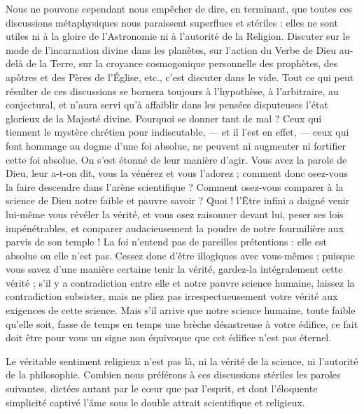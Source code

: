 \documentclass[a4paper, 11pt, oneside, landscape]{article}
\begin{document}
Nous ne pouvons cependant nous empêcher de dire, en terminant, que toutes ces discussions métaphysiques nous paraissent superflues et stériles : elles ne sont utiles ni à la gloire de l'Astronomie ni à l'autorité de la Religion. Discuter sur le mode de l'incarnation divine dans les planètes, sur l'action du Verbe de Dieu au-delà de la Terre, sur la croyance cosmogonique personnelle des prophètes, des apôtres et des Pères de l'Église, etc., c'est discuter dans le vide. Tout ce qui peut résulter de ces discussions se bornera toujours à l'hypothèse, à l'arbitraire, au conjectural, et n'aura servi qu'à affaiblir dans les pensées disputeuses l'état glorieux de la Majesté divine. Pourquoi se donner tant de mal ? Ceux qui tiennent le mystère chrétien pour indiscutable, --- et il l'est en effet, --- ceux qui font hommage au dogme d'une foi absolue, ne peuvent ni augmenter ni fortifier cette foi absolue. On s'est étonné de leur manière d'agir. Vous avez la parole de Dieu, leur a-t-on dit, vous la vénérez et vous l'adorez ; comment donc osez-vous la faire descendre dans l'arène scientifique ? Comment osez-vous comparer à la science de Dieu notre faible et pauvre savoir ? Quoi ! l'Être infini a daigné venir lui-même vous révéler la vérité, et vous osez raisonner devant lui, peser ses lois impénétrables, et comparer audacieusement la poudre de notre fourmilière aux parvis de son temple ! La foi n'entend pas de pareilles prétentions : elle est absolue ou elle n'est pas. Cessez donc d'être illogiques avec vous-mêmes ; puisque vous savez d'une manière certaine tenir la vérité, gardez-la intégralement cette vérité ; s'il y a contradiction entre elle et notre pauvre science humaine, laissez la contradiction subsister, mais ne pliez pas irrespectueusement votre vérité aux exigences de cette science. Mais s'il arrive que notre science humaine, toute faible qu'elle soit, fasse de temps en temps une brèche désastreuse à votre édifice, ce fait doit être pour vous un signe non équivoque que cet édifice n'est pas éternel.

Le véritable sentiment religieux n'est pas là, ni la vérité de la science, ni l'autorité de la philosophie. Combien nous préférons à ces discussions stériles les paroles suivantes, dictées autant par le cœur que par l'esprit, et dont l'éloquente simplicité captivé l'âme sous le double attrait scientifique et religieux.
\end{document}
